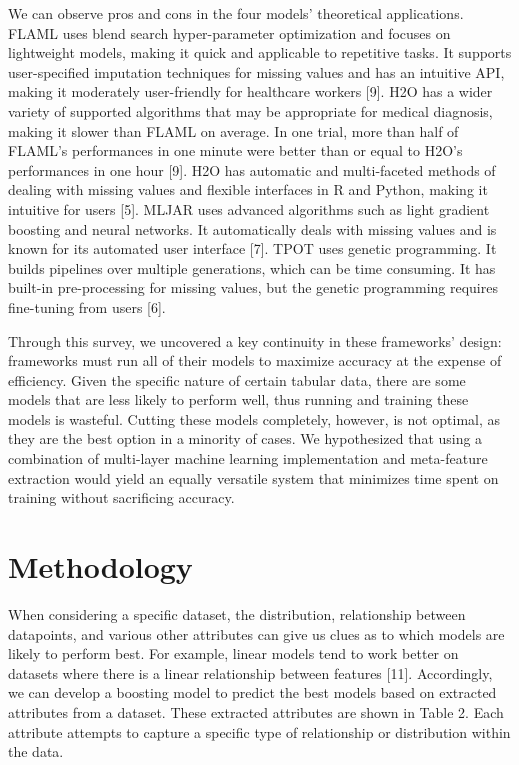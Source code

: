 \documentclass{article}
\begin{document}
We can observe pros and cons in the four models' theoretical applications. FLAML uses blend search hyper-parameter optimization and focuses on lightweight models, making it quick and applicable to repetitive tasks. It supports user-specified imputation techniques for missing values and has an intuitive API, making it moderately user-friendly for healthcare workers [9]. H2O has a wider variety of supported algorithms that may be appropriate for medical diagnosis, making it slower than FLAML on average. In one trial, more than half of FLAML's performances in one minute were better than or equal to H2O's performances in one hour [9]. H2O has automatic and multi-faceted methods of dealing with missing values and flexible interfaces in R and Python, making it intuitive for users [5]. MLJAR uses advanced algorithms such as light gradient boosting and neural networks. It automatically deals with missing values and is known for its automated user interface [7]. TPOT uses genetic programming. It builds pipelines over multiple generations, which can be time consuming. It has built-in pre-processing for missing values, but the genetic programming requires fine-tuning from users [6].

Through this survey, we uncovered a key continuity in these frameworks' design: frameworks must run all of their models to maximize accuracy at the expense of efficiency. Given the specific nature of certain tabular data, there are some models that are less likely to perform well, thus running and training these models is wasteful. Cutting these models completely, however, is not optimal, as they are the best option in a minority of cases. We hypothesized that using a combination of multi-layer machine learning implementation and meta-feature extraction would yield an equally versatile system that minimizes time spent on training without sacrificing accuracy.

\section{Methodology}
When considering a specific dataset, the distribution, relationship between datapoints, and various other attributes can give us clues as to which models are likely to perform best. For example, linear models tend to work better on datasets where there is a linear relationship between features [11]. Accordingly, we can develop a boosting model to predict the best models based on extracted attributes from a dataset. These extracted attributes are shown in Table 2. Each attribute attempts to capture a specific type of relationship or distribution within the data.
\end{document}
